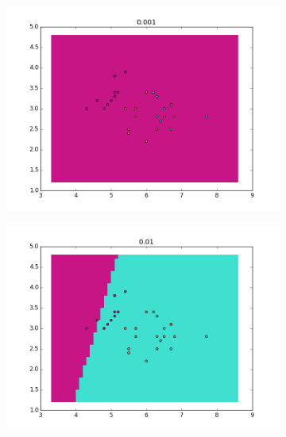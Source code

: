 \documentclass{article}
\begin{document}
								\begin{center}
				\begin{figure}
\centering
        \begin{subfigure}[b]{0.48\textwidth}
                \centering
                \includegraphics[width=\linewidth]{figure_1}
        \end{subfigure}\hfill
        \begin{subfigure}[b]{0.48\textwidth}
                \centering
                \includegraphics[width=\linewidth]{figure_2}
        \end{subfigure}\hfill
 \label{fig:1}
 \end{figure}
       

\end{center}
\end{document}
